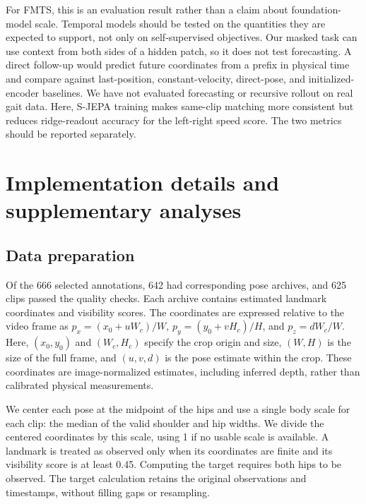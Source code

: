 \documentclass{article}
\begin{document}
For FMTS, this is an evaluation result rather than a claim about
foundation-model scale. Temporal models should be tested on the
quantities they are expected to support, not only on self-supervised
objectives. Our masked task can use context from both sides of a hidden
patch, so it does not test forecasting. A direct follow-up would predict
future coordinates from a prefix in physical time and compare against
last-position, constant-velocity, direct-pose, and initialized-encoder
baselines. We have not evaluated forecasting or recursive rollout on
real gait data. Here, S-JEPA training makes same-clip matching more
consistent but reduces ridge-readout accuracy for the left-right speed
score. The two metrics should be reported separately.

\clearpage


\clearpage
\appendix
\section{Implementation details and supplementary
analyses}\label{implementation-details-and-supplementary-analyses}

\subsection{Data preparation}\label{data-preparation}

Of the 666 selected annotations, 642 had corresponding pose archives,
and 625 clips passed the quality checks. Each archive contains estimated
landmark coordinates and visibility scores. The coordinates are
expressed relative to the video frame as \(p_x=(x_0+uW_c)/W\),
\(p_y=(y_0+vH_c)/H\), and \(p_z=dW_c/W\). Here, \((x_0,y_0)\) and
\((W_c,H_c)\) specify the crop origin and size, \((W,H)\) is the size of
the full frame, and \((u,v,d)\) is the pose estimate within the crop.
These coordinates are image-normalized estimates, including inferred
depth, rather than calibrated physical measurements.

We center each pose at the midpoint of the hips and use a single body
scale for each clip: the median of the valid shoulder and hip widths. We
divide the centered coordinates by this scale, using 1 if no usable
scale is available. A landmark is treated as observed only when its
coordinates are finite and its visibility score is at least 0.45.
Computing the target requires both hips to be observed. The target
calculation retains the original observations and timestamps, without
filling gaps or resampling.
\end{document}
